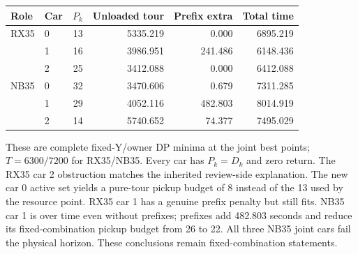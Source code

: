 \begin{center}
\small
\begin{tabular}{llrrrr}
\toprule
Role & Car & $P_k$ & Unloaded tour & Prefix extra & Total time\\
\midrule
RX35 &0&13&5335.219&0.000&6895.219\\
     &1&16&3986.951&241.486&6148.436\\
     &2&25&3412.088&0.000&6412.088\\
NB35 &0&32&3470.606&0.679&7311.285\\
     &1&29&4052.116&482.803&8014.919\\
     &2&14&5740.652&74.377&7495.029\\
\bottomrule
\end{tabular}
\end{center}
These are complete fixed-Y/owner DP minima at the joint best points;
$T=6300/7200$ for RX35/NB35. Every car has $P_k=D_k$ and zero return.
The RX35 car 2 obstruction matches the inherited review-side explanation.
The new car 0 active set yields a pure-tour pickup budget of 8 instead of
the 13 used by the resource point. RX35 car 1 has a genuine prefix penalty
but still fits. NB35 car 1 is over time even without prefixes; prefixes add
482.803 seconds and reduce its fixed-combination pickup budget from 26 to 22.
All three NB35 joint cars fail the physical horizon. These conclusions
remain fixed-combination statements.
